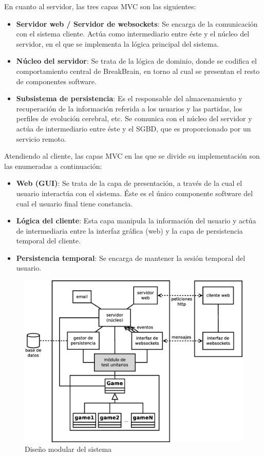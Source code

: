 En cuanto al servidor, las tres capas MVC son las siguientes:

\begin{itemize}
\item {\bf Servidor web / Servidor de websockets}: Se encarga de la comunicación con el sistema cliente. Actúa como intermediario entre éste y el núcleo del servidor, en el que se implementa la lógica principal del sistema.
\item {\bf Núcleo del servidor}: Se trata de la lógica de dominio, donde se codifica el comportamiento central de BreakBrain, en torno al cual se presentan el resto de componentes software.
\item {\bf Subsistema de persistencia}: Es el responsable del almacenamiento y recuperación de la información referida a los usuarios y las partidas, los perfiles de evolución cerebral, etc. Se comunica con el núcleo del servidor y actúa de intermediario entre éste y el \acf{SGBD}, que es proporcionado por un servicio remoto.
\end{itemize}

Atendiendo al cliente, las capas MVC en las que se divide su implementación son las enumeradas a continuación:

\begin{itemize}
\item {\bf Web (GUI)}: Se trata de la capa de presentación, a través de la cual el usuario interactúa con el sistema. Éste es el único componente software del cual el usuario final tiene constancia.
\item {\bf Lógica del cliente}: Esta capa manipula la información del usuario y actúa de intermediaria entre la interfaz gráfica (web) y la capa de persistencia temporal del cliente.
\item {\bf Persistencia temporal}: Se encarga de mantener la sesión temporal del usuario.
\end{itemize}

\begin{figure}[h]
  \begin{center}
    \includegraphics[width=\textwidth]{images/diseno.eps}
    \caption{Diseño modular del sistema}
    \label{fig::diseno}
  \end{center}
\end{figure}

